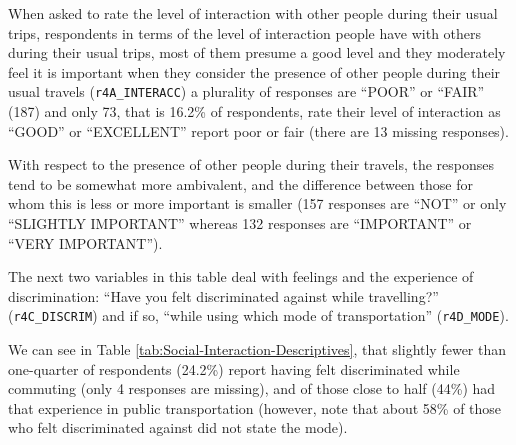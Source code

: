\documentclass[
11pt, %
oneside, %
english, %
singlespacing, %
]{macthesis} %
\newcommand{\blandscape}{\begin{landscape}}
\newcommand{\elandscape}{\end{landscape}}
\begin{document}
When asked to rate the level of interaction with other people during their usual trips, respondents in terms of the level of interaction people have with others during their usual trips, most of them presume a good level and they moderately feel it is important when they consider the presence of other people during their usual travels (\texttt{r4A\_INTERACC}) a plurality of responses are ``POOR'' or ``FAIR'' (187) and only 73, that is 16.2\% of respondents, rate their level of interaction as ``GOOD'' or ``EXCELLENT'' report poor or fair (there are 13 missing responses).

With respect to the presence of other people during their travels, the responses tend to be somewhat more ambivalent, and the difference between those for whom this is less or more important is smaller (157 responses are ``NOT'' or only ``SLIGHTLY IMPORTANT'' whereas 132 responses are ``IMPORTANT'' or ``VERY IMPORTANT'').

The next two variables in this table deal with feelings and the experience of discrimination: ``Have you felt discriminated against while travelling?'' (\texttt{r4C\_DISCRIM}) and if so, ``while using which mode of transportation'' (\texttt{r4D\_MODE}).

We can see in Table \ref{tab:Social-Interaction-Descriptives}, that slightly fewer than one-quarter of respondents (24.2\%) report having felt discriminated while commuting (only 4 responses are missing), and of those close to half (44\%) had that experience in public transportation (however, note that about 58\% of those who felt discriminated against did not state the mode).

\newpage
\blandscape
\begin{table}

\caption{\label{tab:unnamed-chunk-12}\label{tab:Social-Interaction-Descriptives}Variables regarding social interactions of respondents}
\centering
{}
\end{table}
\elandscape
\newpage
\end{document}
